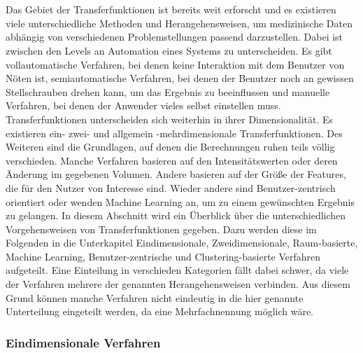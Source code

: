 \chapter{}
\label{sec:state_of_the_art}






Das Gebiet der Transferfunktionen ist bereits weit erforscht und es existieren viele unterschiedliche Methoden und Herangehensweisen, um medizinische Daten abhängig von verschiedenen Problemstellungen passend darzustellen.
\newline
Dabei ist zwischen den Levels an Automation eines Systems zu unterscheiden. Es gibt vollautomatische Verfahren, bei denen keine Interaktion mit dem Benutzer von Nöten ist, semiautomatische Verfahren, bei denen der Benutzer noch an gewissen Stellschrauben drehen kann, um das Ergebnis zu beeinflussen und manuelle Verfahren, bei denen der Anwender vieles selbst einstellen muss.
\newline
Transferfunktionen unterscheiden sich weiterhin in ihrer Dimensionalität. Es existieren ein- zwei- und allgemein -mehrdimensionale Transferfunktionen.
Des Weiteren sind die Grundlagen, auf denen die Berechnungen ruhen teils völlig verschieden. Manche Verfahren basieren auf den Intensitätswerten oder deren Änderung im gegebenen Volumen. Andere basieren auf der Größe der Features, die für den Nutzer von Interesse sind. Wieder andere sind Benutzer-zentrisch orientiert oder wenden Machine Learning an, um zu einem gewünschten Ergebnis zu gelangen.
\newline
In diesem Abschnitt wird ein Überblick über die unterschiedlichen Vorgehensweisen von Transferfunktionen gegeben. Dazu werden diese im Folgenden in die Unterkapitel Eindimensionale, Zweidimensionale, Raum-basierte, Machine Learning, Benutzer-zentrische und Clustering-basierte Verfahren aufgeteilt.
Eine Einteilung in verschieden Kategorien fällt dabei schwer, da viele der Verfahren mehrere der genannten Herangehensweisen verbinden. Aus diesem Grund können manche Verfahren nicht eindeutig in die hier genannte Unterteilung eingeteilt werden, da eine Mehrfachnennung möglich wäre.


\subsection{Eindimensionale Verfahren}

